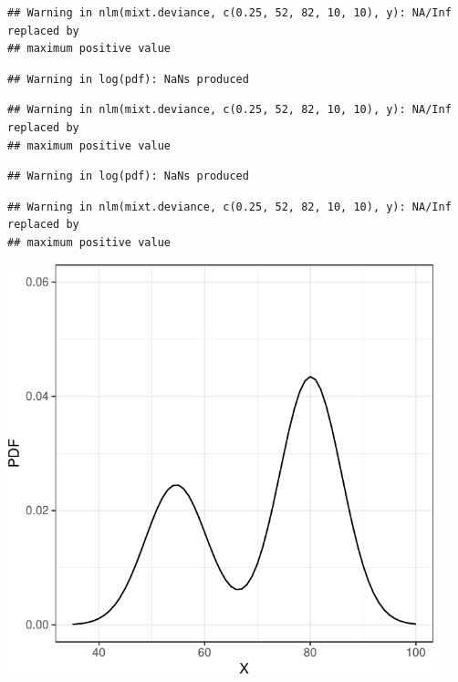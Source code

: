 \documentclass[
]{article}
\begin{document}
\begin{verbatim}
## Warning in nlm(mixt.deviance, c(0.25, 52, 82, 10, 10), y): NA/Inf replaced by
## maximum positive value
\end{verbatim}

\begin{verbatim}
## Warning in log(pdf): NaNs produced
\end{verbatim}

\begin{verbatim}
## Warning in nlm(mixt.deviance, c(0.25, 52, 82, 10, 10), y): NA/Inf replaced by
## maximum positive value
\end{verbatim}

\begin{verbatim}
## Warning in log(pdf): NaNs produced
\end{verbatim}

\begin{verbatim}
## Warning in nlm(mixt.deviance, c(0.25, 52, 82, 10, 10), y): NA/Inf replaced by
## maximum positive value
\end{verbatim}

\includegraphics[width=468px]{plot_calibration_files/figure-latex/t1-1}
\end{document}
